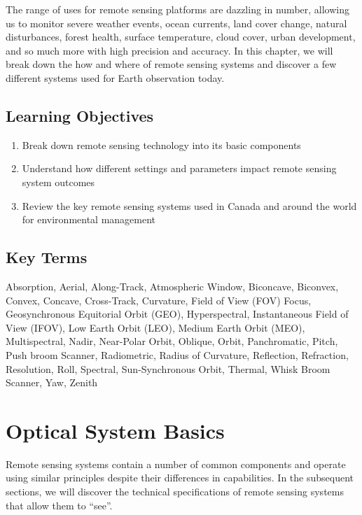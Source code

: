 \documentclass[
]{book}
\providecommand{\tightlist}{%
  \setlength{\itemsep}{0pt}\setlength{\parskip}{0pt}}
\begin{document}
The range of uses for remote sensing platforms are dazzling in number, allowing us to monitor severe weather events, ocean currents, land cover change, natural disturbances, forest health, surface temperature, cloud cover, urban development, and so much more with high precision and accuracy. In this chapter, we will break down the how and where of remote sensing systems and discover a few different systems used for Earth observation today.

\subsection*{Learning Objectives}\label{learning-objectives-9}

\begin{enumerate}
\def\labelenumi{\arabic{enumi}.}
\tightlist
\item
  Break down remote sensing technology into its basic components
\item
  Understand how different settings and parameters impact remote sensing system outcomes
\item
  Review the key remote sensing systems used in Canada and around the world for environmental management
\end{enumerate}

\subsection*{Key Terms}\label{key-terms-9}

Absorption, Aerial, Along-Track, Atmospheric Window, Biconcave, Biconvex, Convex, Concave, Cross-Track, Curvature, Field of View (FOV) Focus, Geosynchronous Equitorial Orbit (GEO), Hyperspectral, Instantaneous Field of View (IFOV), Low Earth Orbit (LEO), Medium Earth Orbit (MEO), Multispectral, Nadir, Near-Polar Orbit, Oblique, Orbit, Panchromatic, Pitch, Push broom Scanner, Radiometric, Radius of Curvature, Reflection, Refraction, Resolution, Roll, Spectral, Sun-Synchronous Orbit, Thermal, Whisk Broom Scanner, Yaw, Zenith

\section{Optical System Basics}\label{optical-system-basics}

Remote sensing systems contain a number of common components and operate using similar principles despite their differences in capabilities. In the subsequent sections, we will discover the technical specifications of remote sensing systems that allow them to ``see''.
\end{document}
